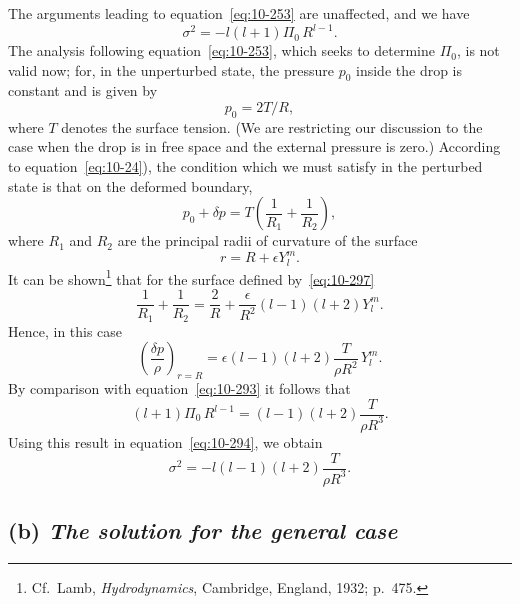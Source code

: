 The arguments leading to equation~\eqref{eq:10-253} are unaffected, and we have
\begin{equation}
\label{eq:10-294}
\sigma^2 = -l(l+1)\Pi_0\,R^{l-1}.
\end{equation}
The analysis following equation~\eqref{eq:10-253}, which seeks to determine $\Pi_0$, is not valid now; for, in the unperturbed state, the pressure $p_0$ inside the drop is constant and is given by
\begin{equation}
\label{eq:10-295}
p_0 = 2T/R,
\end{equation}
where $T$ denotes the surface tension. (We are restricting our discussion to the case when the drop is in free space and the external pressure is zero.) According to equation~\eqref{eq:10-24}), the condition which we must satisfy in the perturbed state is that on the deformed boundary,
\begin{equation}
\label{eq:10-296}
p_0+\delta p = T\!\left(\frac{1}{R_1}+\frac{1}{R_2}\right)\!,
\end{equation}
where $R_1$ and $R_2$ are the principal radii of curvature of the surface
\begin{equation}
\label{eq:10-297}
r = R+\epsilon Y_l^m.
\end{equation}
It can be shown\footnote{Cf.\ Lamb, \textit{Hydrodynamics}, Cambridge, England, 1932; p.~475.} that for the surface defined by~\eqref{eq:10-297}
\begin{equation}
\label{eq:10-298}
\frac{1}{R_1}+\frac{1}{R_2} = \frac{2}{R}+\frac{\epsilon}{R^2}(l-1)(l+2)Y_l^m.
\end{equation}
Hence, in this case
\begin{equation}
\label{eq:10-299}
\left(\frac{\delta p}{\rho}\right)_{r=R} = \epsilon(l-1)(l+2)\frac{T}{\rho R^2}\,Y_l^m.
\end{equation}
By comparison with equation~\eqref{eq:10-293} it follows that
\begin{equation}
\label{eq:10-300}
(l+1)\Pi_0\,R^{l-1} = (l-1)(l+2)\frac{T}{\rho R^3}.
\end{equation}
Using this result in equation~\eqref{eq:10-294}, we obtain
\begin{equation}
\label{eq:10-301}
\sigma^2 = -l(l-1)(l+2)\frac{T}{\rho R^3}.
\end{equation}

\subsection*{(b) \textit{The solution for the general case}}


